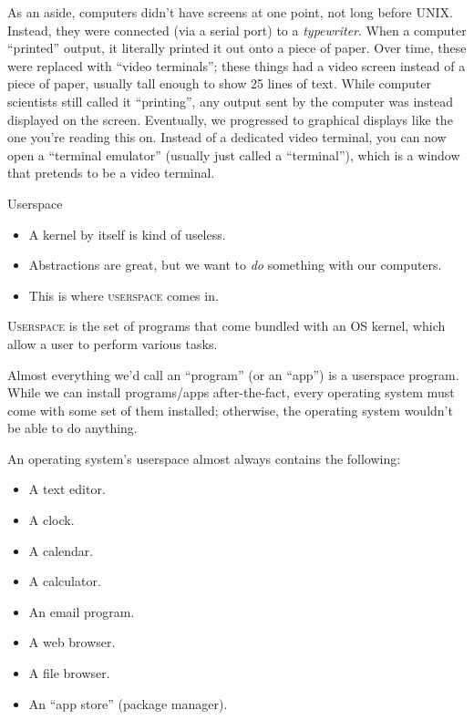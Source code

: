 As an aside, computers didn't have screens at one point, not long before UNIX.
Instead, they were connected (via a serial port) to a \textit{typewriter}.
When a computer \enquote{printed} output, it literally printed it out onto a
piece of paper. Over time, these were replaced with \enquote{video terminals};
these things had a video screen instead of a piece of paper, usually tall
enough to show 25 lines of text.  While computer scientists still called it
\enquote{printing}, any output sent by the computer was instead displayed on
the screen.  Eventually, we progressed to graphical displays like the one
you're reading this on.  Instead of a dedicated video terminal, you can now
open a \enquote{terminal emulator} (usually just called a \enquote{terminal}),
which is a window that pretends to be a video terminal.

\begin{frame}{Userspace}
  \begin{itemize}
    \item
      A kernel by itself is kind of useless.\pause
    \item
      Abstractions are great, but we want to \textit{do} something with our
      computers.\pause
    \item
      This is where \textsc{userspace} comes in.\pause
  \end{itemize}
  \begin{definition}[userspace]
    \textsc{Userspace} is the set of programs that come bundled with an OS
    kernel, which allow a user to perform various tasks.
  \end{definition}
\end{frame}

Almost everything we'd call an ``program'' (or an ``app'') is a userspace
program.  While we can install programs/apps after-the-fact, every operating
system must come with some set of them installed; otherwise, the operating
system wouldn't be able to do anything.

An operating system's userspace almost always contains the following:
\begin{itemize}
  \item A text editor.
  \item A clock.
  \item A calendar.
  \item A calculator.
  \item An email program.
  \item A web browser.
  \item A file browser.
  \item An \enquote{app store} (package manager).
\end{itemize}

